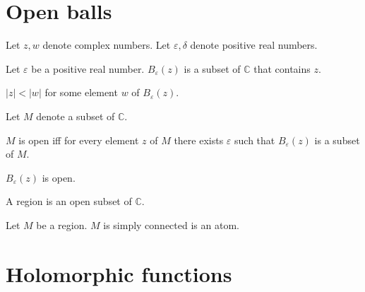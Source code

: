 \documentclass{article}
\newcommand{\Ball}[2]{B_{#1}(#2)}
\begin{document}
\section{Open balls}

\begin{forthel}
Let $z, w$ denote complex numbers.
Let $\varepsilon, \delta$ denote positive real numbers.

\begin{signature}
  Let $\varepsilon$ be a positive real number.
  $\Ball{\varepsilon}{z}$ is a subset of $\mathbb{C}$ that contains $z$.
\end{signature}

\begin{axiom}
  $|z| < |w|$ for some element $w$ of $\Ball{\varepsilon}{z}$.
\end{axiom}

Let $M$ denote a subset of $\mathbb{C}$.

\begin{definition}
  $M$ is open iff for every element $z$ of $M$ there exists $\varepsilon$ such that
  $\Ball{\varepsilon}{z}$ is a subset of $M$.
\end{definition}

\begin{axiom}
  $\Ball{\varepsilon}{z}$ is open.
\end{axiom}

\begin{signature}
  A region is an open subset of $\mathbb{C}$.
\end{signature}

\begin{signature}
  Let $M$ be a region.
  $M$ is simply connected is an atom.
\end{signature}
\end{forthel}


\section{Holomorphic functions}
\end{document}
